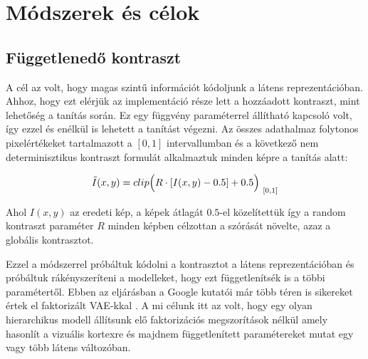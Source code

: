 \documentclass[12pt, english]{article}
\begin{document}
\newpage

\section{Módszerek és célok}

\vspace{7mm}

\subsection{Függetlenedő kontraszt}

\vspace{5mm}

\par A cél az volt, hogy magas szintű információt kódoljunk a látens reprezentációban. Ahhoz, hogy ezt elérjük az implementáció része lett a hozzáadott kontraszt, mint lehetőség a tanítás során. Ez egy függvény paraméterrel állítható kapcsoló volt, így ezzel és enélkül is lehetett a tanítást végezni. Az összes adathalmaz folytonos pixelértékeket tartalmazott a $[0, 1]$ intervallumban és a következő nem determinisztikus kontraszt formulát alkalmaztuk minden képre a tanítás alatt:

\vspace{4mm}

\begin{equation}
    \Tilde{I}(x, y) = clip\Big(R \cdot [I(x, y) - 0.5] + 0.5\Big)_{\ [0, 1]}
\end{equation}

\vspace{4mm}

\par Ahol $I(x, y)$ az eredeti kép, a képek átlagát $0.5$-el közelítettük így a random kontraszt paraméter $R$ minden képben célzottan a szórását növelte, azaz a globális kontrasztot.

\vspace{4mm}

\par Ezzel a módszerrel próbáltuk kódolni a kontrasztot a látens reprezentációban és próbáltuk rákényszeríteni a modelleket, hogy ezt függetlenítsék is a többi paramétertől. Ebben az eljárásban a Google kutatói már több téren is sikereket értek el faktorizált VAE-kkal \cite{DBLP:journals/corr/abs-1811-12359}. A mi célunk itt az volt, hogy egy olyan hierarchikus modell állítsunk elő faktorizációs megszorítások nélkül amely hasonlít a vizuális kortexre és majdnem függetlenített paramétereket mutat egy vagy több látens változóban.
\end{document}
